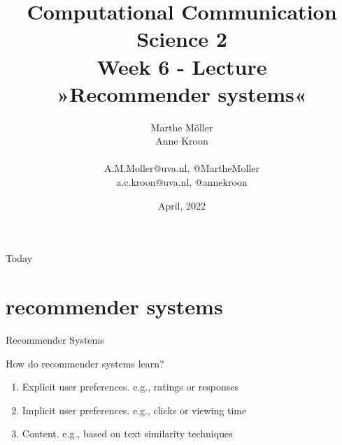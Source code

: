 \documentclass[compress]{beamer}
\title[Computational Communication Science 2]{\textbf{Computational Communication Science 2} \\Week 6 - Lecture\\ »Recommender systems«}
\author[Marthe Möller, Anne Kroon]{Marthe Möller \\ Anne Kroon \\ ~ \\ \footnotesize{A.M.Moller@uva.nl, @MartheMoller \\a.c.kroon@uva.nl, @annekroon} \\}
\date{April, 2022}
\institute[Digital Society Minor, University of Amsterdam]{Digital Society Minor, University of Amsterdam}
\begin{document}
	
	\begin{frame}{}
		\titlepage
	\end{frame}
	
	\begin{frame}{Today}
		\tableofcontents
	\end{frame}

\section{recommender systems}

\begin{frame}
\end{frame}


\begin{frame}{Recommender Systems} 
	\begin{block}{How do recommender systems learn?}
		\begin{enumerate}
			\item<2-> \alert{Explicit user preferences}.  e.g., ratings or responses 
			\item<3-> \alert{Implicit user preferences}.  e.g., clicks or viewing time
			\item<3-> \alert{Content}. e.g., based on text similarity techniques
		\end{enumerate}
	\end{block}
\end{frame}
\end{document}
